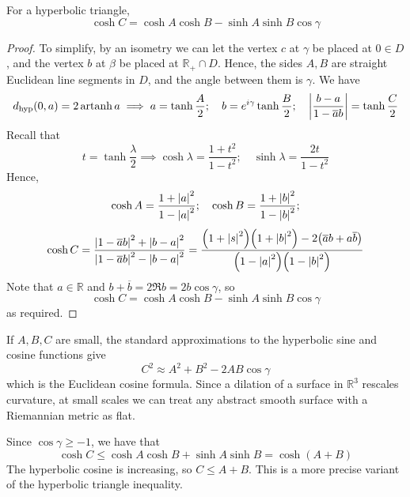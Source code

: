 \begin{proposition}
	For a hyperbolic triangle,
	\[
		\cosh C = \cosh A \cosh B - \sinh A \sinh B \cos \gamma
	\]
\end{proposition}
\begin{proof}
	To simplify, by an isometry we can let the vertex \( c \) at \( \gamma \) be placed at \( 0 \in D \), and the vertex \( b \) at \( \beta \) be placed at \( \mathbb R_+ \cap D \).
	Hence, the sides \( A, B \) are straight Euclidean line segments in \( D \), and the angle between them is \( \gamma \).
	We have
	\[
		d_{\text{hyp}}(0,a) = 2 \operatorname{artanh} a \implies a = \tanh \frac{A}{2};\quad b = e^{i\gamma} \tanh \frac{B}{2};\quad \abs{\frac{b-a}{1-\overline a b}} = \tanh \frac{C}{2}
	\]
	Recall that
	\[
		t = \tanh \frac{\lambda}{2} \implies \cosh \lambda = \frac{1+t^2}{1-t^2};\quad \sinh \lambda = \frac{2t}{1-t^2}
	\]
	Hence,
	\[
		\cosh A = \frac{1 + \abs{a}^2}{1 - \abs{a}^2};\quad \cosh B = \frac{1 + \abs{b}^2}{1 - \abs{b}^2};
	\]
	\[
		\cosh C = \frac{\abs{1-\overline a b}^2 + \abs{b-a}^2}{\abs{1-\overline a b}^2 - \abs{b-a}^2} = \frac{\qty(1+\abs{s}^2)\qty(1+\abs{b}^2) - 2\qty(\overline a b + a \overline b)}{\qty(1 - \abs{a}^2)\qty(1 - \abs{b}^2)}
	\]
	Note that \( a \in \mathbb R \) and \( b + \overline b = 2 \Re b = 2b \cos \gamma \), so
	\[
		\cosh C = \cosh A \cosh B - \sinh A \sinh B \cos \gamma
	\]
	as required.
\end{proof}
\begin{remark}
	If \( A, B, C \) are small, the standard approximations to the hyperbolic sine and cosine functions give
	\[
		C^2 \approx A^2 + B^2 - 2AB \cos \gamma
	\]
	which is the Euclidean cosine formula.
	Since a dilation of a surface in \( \mathbb R^3 \) rescales curvature, at small scales we can treat any abstract smooth surface with a Riemannian metric as flat.

	Since \( \cos \gamma \geq -1 \), we have that
	\[
		\cosh C \leq \cosh A \cosh B + \sinh A \sinh B = \cosh(A+B)
	\]
	The hyperbolic cosine is increasing, so \( C \leq A + B \).
	This is a more precise variant of the hyperbolic triangle inequality.
\end{remark}


